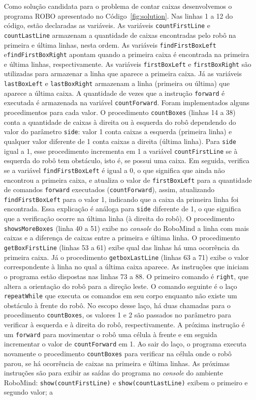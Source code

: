 Como solução candidata para o problema de contar caixas desenvolvemos o programa ROBO apresentado no Código~\ref{fig:solution}. Nas linhas 1 a 12 do código, estão declaradas as variáveis. As variáveis \texttt{countFirstLine} e \texttt{countLastLine} armazenam a quantidade de caixas encontradas pelo robô na primeira e última linhas, nesta ordem. As variáveis \texttt{findFirstBoxLeft} e\texttt{findFirstBoxRight} apontam quando a primeira caixa é encontrada na primeira e última linhas, respectivamente. As variáveis \texttt{firstBoxLeft} e \texttt{firstBoxRight} são utilizadas para armazenar a linha que aparece a primeira caixa. Já as variáveis \texttt{lastBoxLeft} e \texttt{lastBoxRight} armazenam a linha (primeira ou última) que aparece a última caixa. A quantidade de vezes que a instrução \texttt{forward} é executada é armazenada na variável \texttt{countForward}. Foram implementados alguns procedimentos para cada valor. O procedimento \texttt{countBoxes} (linhas 14 a 38) conta a quantidade de caixas à direita ou à esquerda do robô dependendo do valor do parâmetro \texttt{side}: valor 1 conta caixas a esquerda (primeira linha) e qualquer valor diferente de 1 conta caixas a direita (última linha). Para \texttt{side} igual a 1, esse procedimento incrementa em 1 a variável \texttt{countFirstLine} se à esquerda do robô tem obstáculo, isto é, se possui uma caixa. Em seguida, verifica se a variável \texttt{findFirstBoxLeft} é igual a 0, o que significa que ainda não encontrou a primeira caixa, e atualiza o valor de \texttt{firstBoxLeft} para a quantidade de comandos \texttt{forward} executados (\texttt{countForward}), assim, atualizando \texttt{findFirstBoxLeft} para o valor 1, indicando que a caixa da primeira linha foi encontrada. Essa explicação é análoga para \texttt{side} diferente de 1, o que significa que a verificação ocorre na última linha (à direita do robô). O procedimento \texttt{showsMoreBoxes} (linha 40 a 51) exibe no \textit{console} do RoboMind a linha com mais caixas e a diferença de caixas entre a primeira e última linha. O procedimento \texttt{getBoxFirstLine} (linhas 53 a 61) exibe qual das linhas há uma ocorrência da primeira caixa. Já o procedimento \texttt{getboxLastLine} (linhas 63 a 71) exibe o valor correspondente à linha no qual a última caixa aparece. As instruções que iniciam o programa estão dispostas nas linhas 73 a 88. O primeiro comando é \texttt{right}, que altera a orientação do robô para a direção leste. O comando seguinte é o laço \texttt{repeatWhile} que executa os comandos em seu corpo enquanto não existe um obstáculo à frente do robô. No escopo desse laço, há duas chamadas para o procedimento \texttt{countBoxes}, os valores 1 e 2 são passados no parâmetro para verificar à esquerda e à direita do robô, respectivamente. A próxima instrução é um \texttt{forward} para movimentar o robô uma célula à frente e em seguida incrementar o valor de \texttt{countForward} em 1. Ao sair do laço, o programa executa novamente o procedimento \texttt{countBoxes} para verificar na célula onde o robô parou, se há ocorrência de caixas na primeira e última linhas. As próximas instruções são para exibir as saídas do programa no \textit{console} do ambiente RoboMind: \texttt{show(countFirstLine)} e \texttt{show(countLastLine)} exibem o primeiro e segundo valor; a 